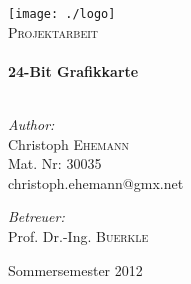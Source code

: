 \begin{titlepage}

\begin{center}


\texttt{[image: ./logo]}\\[1cm]    

\textsc{\Large Projektarbeit}\\[0.5cm]


\HRule \\[0.8cm]
{ \huge \bfseries 24-Bit Grafikkarte}\\[0.4cm]

\HRule \\[1.5cm]

\begin{minipage}[t]{0.4\textwidth}
\begin{flushleft} \large
\emph{Author:}\\
Christoph \textsc{Ehemann}\\
Mat. Nr: 30035\\
christoph.ehemann@gmx.net
\end{flushleft}
\end{minipage}
\begin{minipage}[t]{0.4\textwidth}
\begin{flushright} \large
\emph{Betreuer:} \\
Prof. Dr.-Ing. \textsc{Buerkle}\\
\end{flushright}
\end{minipage}

\vfill

{\large {Sommersemester 2012}}

\end{center}

\end{titlepage}